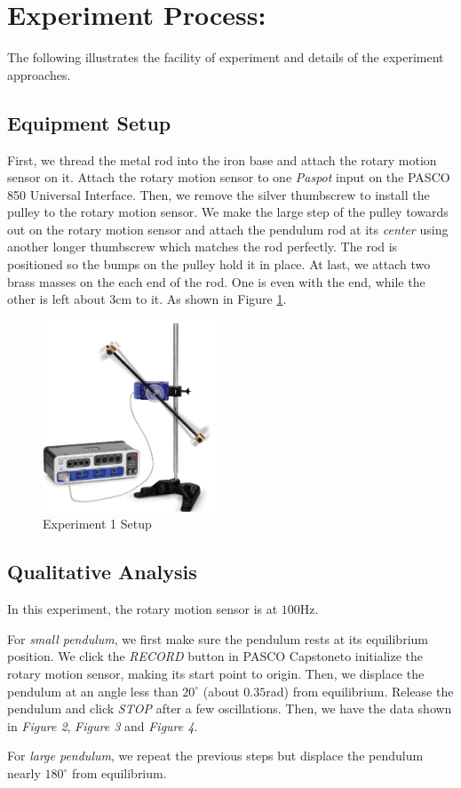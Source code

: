 \section{Experiment Process:}
The following illustrates the facility of experiment and details of the experiment approaches.

\subsection{Equipment Setup}
First, we thread the metal rod into the iron base and attach the rotary motion sensor on it. Attach the rotary motion sensor to one \textit{Paspot} input on the PASCO 850 Universal Interface. Then, we remove the silver thumbscrew to install the pulley to the rotary motion sensor. We make the large step of the pulley towards out on the rotary motion sensor and attach the pendulum rod at its \emph{center} using another longer thumbscrew which matches the rod perfectly. The rod is positioned so the bumps on the pulley hold it in place. At last, we attach two brass masses on the each end of the rod. One is even with the end, while the other is left about $3$cm to it. As shown in Figure \ref{figSetup}.
\begin{figure}[H]
  \centering\includegraphics[width=5.2cm]{figSetup.png}
  \caption{Experiment 1 Setup}
  \label{figSetup}
\end{figure}

\subsection{Qualitative Analysis}
In this experiment, the rotary motion sensor is at $100$Hz.\par
For \emph{small pendulum}, we first make sure the pendulum rests at its equilibrium position. We click the \textit{RECORD} button in PASCO Capstone\texttrademark to initialize the rotary motion sensor, making its start point to origin. Then, we displace the pendulum at an angle less than $20^\circ$ (about $0.35$rad) from equilibrium. Release the pendulum and click \textit{STOP} after a few oscillations. Then, we have the data shown in \emph{Figure 2}, \emph{Figure 3} and \emph{Figure 4}.\par
For \emph{large pendulum}, we repeat the previous steps but displace the pendulum nearly $180^\circ$ from equilibrium.

